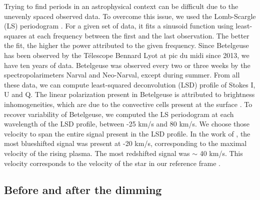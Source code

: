 \documentclass{aa}
\begin{document}
Trying to find periods in an astrophysical context can be difficult due to the unevenly spaced observed data. To overcome this issue, 
we used the Lomb-Scargle (LS) periodogram \citep{Lomb1976,Scargle1982}. For a given set of data, it fits a sinusoid function using least-squares at each 
frequency between the first and the last observation. The better the fit, the higher the power attributed to the given frequency. Since Betelgeuse has 
been observed by the Télescope Bennard Lyot at pic du midi since 2013, we have ten years of data. Betelgeuse was observed every two or three weeks by 
the spectropolarimeters Narval and Neo-Narval, except during summer. From all these data, we can compute least-squared 
deconvolution (LSD) \citep{Donati1997} profile of Stokes I, U and Q. The linear polarization present in Betelgeuse is attributed to brightness 
inhomogeneities, which are due to the convective cells present at the surface \citep{LopezAriste2018}. To recover variability of Betelgeuse, 
we computed the LS periodogram at each wavelength of the LSD profile, between -25 km/s and 80 km/s. We choose those velocity to span the entire 
signal present in the LSD profile. In the work of \cite{LopezAriste2018}, the most blueshifted signal was present at -20 km/s, 
corresponding to the maximal velocity of the rising plasma. The most redshifted signal was $\sim$ 40 km/s. This velocity corresponds 
to the velocity of the star in our reference frame \citep{LopezAriste2018}. 


\subsection{Before and after the dimming}
\end{document}
